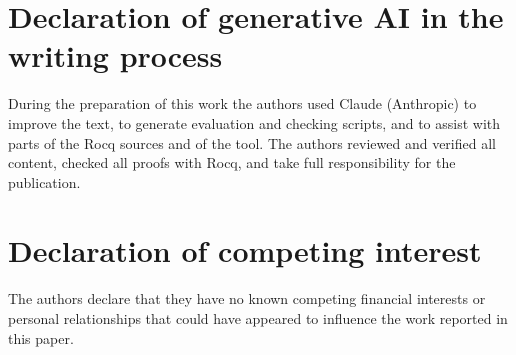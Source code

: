 \documentclass[preprint,12pt]{elsarticle}
\begin{document}
\section*{Declaration of generative AI in the writing process}
During the preparation of this work the authors used Claude (Anthropic) to improve the text, to generate evaluation and checking scripts, and to assist with parts of the Rocq sources and of the tool. The authors reviewed and verified all content, checked all proofs with Rocq, and take full responsibility for the publication.

\section*{Declaration of competing interest}
The authors declare that they have no known competing financial interests or personal relationships that could have appeared to influence the work reported in this paper.



\end{document}
